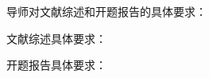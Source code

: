 {
    \setlength{\parindent}{0em}
    \par { 导师对文献综述和开题报告的具体要求：}
    \par {文献综述具体要求：}

    \par {开题报告具体要求：}
}

\mbox{} \vfill

